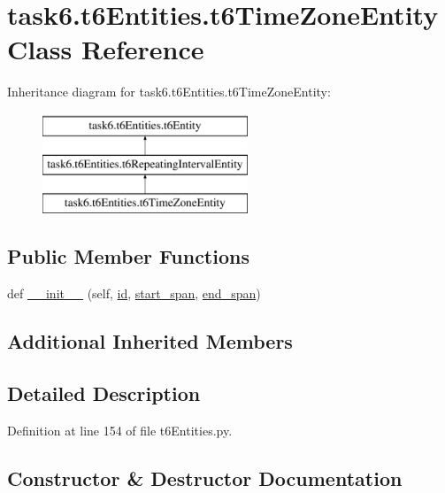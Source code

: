 \hypertarget{classtask6_1_1t6Entities_1_1t6TimeZoneEntity}{}\section{task6.\+t6\+Entities.\+t6\+Time\+Zone\+Entity Class Reference}
\label{classtask6_1_1t6Entities_1_1t6TimeZoneEntity}
Inheritance diagram for task6.\+t6\+Entities.\+t6\+Time\+Zone\+Entity\+:\begin{figure}[H]
\begin{center}
\leavevmode
\includegraphics[height=3.000000cm]{classtask6_1_1t6Entities_1_1t6TimeZoneEntity}
\end{center}
\end{figure}
\subsection*{Public Member Functions}
\begin{DoxyCompactItemize}
\item 
def \hyperlink{classtask6_1_1t6Entities_1_1t6TimeZoneEntity_a10b11fcad44b340ff83e9eaa8c4aa2d4}{\+\_\+\+\_\+init\+\_\+\+\_\+} (self, \hyperlink{classtask6_1_1t6Entities_1_1t6Entity_a96b2e7fb553c920ab2db6f6deb31e3b4}{id}, \hyperlink{classtask6_1_1t6Entities_1_1t6Entity_a8221c36d2995a24200cdfbd74cc9233c}{start\+\_\+span}, \hyperlink{classtask6_1_1t6Entities_1_1t6Entity_a597d42bb02fc9f42277098f0ce21917c}{end\+\_\+span})
\end{DoxyCompactItemize}
\subsection*{Additional Inherited Members}


\subsection{Detailed Description}


Definition at line 154 of file t6\+Entities.\+py.



\subsection{Constructor \& Destructor Documentation}
\mbox{\label{classtask6_1_1t6Entities_1_1t6TimeZoneEntity_a10b11fcad44b340ff83e9eaa8c4aa2d4}} 
